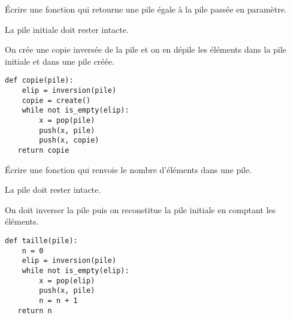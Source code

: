 \begin{Exercise}[title = {Copie d'une pile}]\it

Écrire une fonction qui retourne une pile égale à la pile passée en paramètre. 

La pile initiale doit rester intacte.
\end{Exercise} 
\begin{Answer}
On crée une copie inversée de la pile et on en dépile les éléments dans la pile initiale et dans une pile créée.
\begin{lstlisting}
def copie(pile):
    elip = inversion(pile)
    copie = create()
    while not is_empty(elip):
        x = pop(pile)
        push(x, pile)
        push(x, copie)
   return copie
\end{lstlisting}
\newpage
\end{Answer}
\begin{Exercise}[title = {Longueur d'une pile}]\it

Écrire une fonction  qui renvoie le nombre d'éléments dans une pile.

La pile doit rester intacte.
\end{Exercise} 
\begin{Answer}
On doit inverser la pile puis on reconstitue la pile initiale en comptant les éléments.

\begin{lstlisting}
def taille(pile):
    n = 0
    elip = inversion(pile)
    while not is_empty(elip):
        x = pop(elip)
        push(x, pile)
        n = n + 1
   return n
\end{lstlisting}
\end{Answer}

